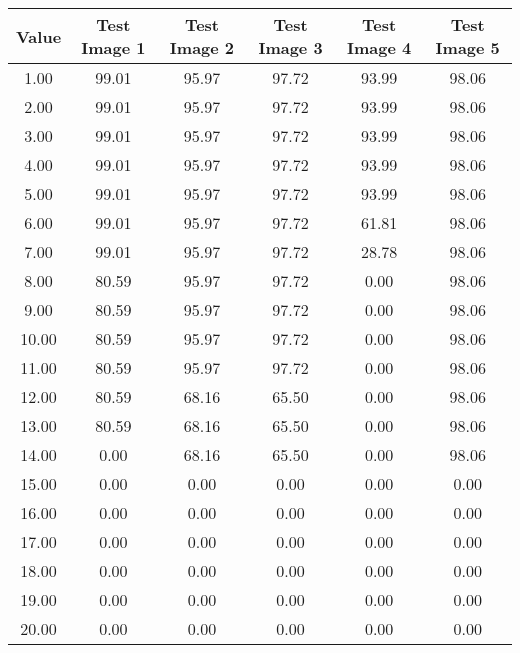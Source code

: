 \begin{tabular}{|c|c|c|c|c|c|}
\hline
\textbf{Value}&\textbf{Test Image 1}&\textbf{Test Image 2}&\textbf{Test Image 3}&\textbf{Test Image 4}&\textbf{Test Image 5}\\\hline
1.00&99.01&95.97&97.72&93.99&98.06\\\hline
2.00&99.01&95.97&97.72&93.99&98.06\\\hline
3.00&99.01&95.97&97.72&93.99&98.06\\\hline
4.00&99.01&95.97&97.72&93.99&98.06\\\hline
5.00&99.01&95.97&97.72&93.99&98.06\\\hline
6.00&99.01&95.97&97.72&61.81&98.06\\\hline
7.00&99.01&95.97&97.72&28.78&98.06\\\hline
8.00&80.59&95.97&97.72&0.00&98.06\\\hline
9.00&80.59&95.97&97.72&0.00&98.06\\\hline
10.00&80.59&95.97&97.72&0.00&98.06\\\hline
11.00&80.59&95.97&97.72&0.00&98.06\\\hline
12.00&80.59&68.16&65.50&0.00&98.06\\\hline
13.00&80.59&68.16&65.50&0.00&98.06\\\hline
14.00&0.00&68.16&65.50&0.00&98.06\\\hline
15.00&0.00&0.00&0.00&0.00&0.00\\\hline
16.00&0.00&0.00&0.00&0.00&0.00\\\hline
17.00&0.00&0.00&0.00&0.00&0.00\\\hline
18.00&0.00&0.00&0.00&0.00&0.00\\\hline
19.00&0.00&0.00&0.00&0.00&0.00\\\hline
20.00&0.00&0.00&0.00&0.00&0.00\\\hline
\end{tabular}
